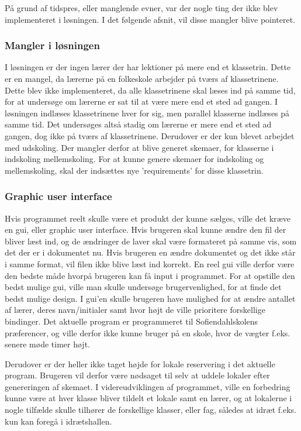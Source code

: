 På grund af tidspres, eller manglende evner, var der nogle ting der ikke blev implementeret i løsningen. I det følgende afsnit, vil disse mangler blive pointeret. 
\subsubsection{Mangler i løsningen}

I løsningen er der ingen lærer der har lektioner på mere end et klassetrin. Dette er en mangel, da lærerne på en folkeskole arbejder på tværs af klassetrinene. Dette blev ikke implementeret, da alle klassetrinene skal læses ind på samme tid, for at undersøge om lærerne er sat til at være mere end et sted ad gangen. I løsningen indlæses klassetrinene hver for sig, men parallel klasserne indlæses på samme tid. Det undersøges altså stadig om lærerne er mere end et sted ad gangen, dog ikke på tværs af klassetrinene. 
Derudover er der kun blevet arbejdet med udskoling. Der mangler derfor at blive generet skemaer, for klasserne i indskoling mellemskoling. For at kunne genere skemaer for indskoling og mellemskoling, skal der indsættes nye ’requirements’ for disse klassetrin.
\subsubsection{Graphic user interface}

Hvis programmet reelt skulle være et produkt der kunne sælges, ville det kræve en gui, eller graphic user interface. Hvis brugeren skal kunne ændre den fil der bliver læst ind, og de ændringer de laver skal være formateret på samme vis, som det der er i dokumentet nu. Hvis brugeren en ændre dokumentet og det ikke står i samme format, vil filen ikke blive læst ind korrekt. En reel gui ville derfor være den bedste måde hvorpå brugeren kan få input i programmet. For at opstille den bedst mulige gui, ville man skulle undersøge brugervenlighed, for at finde det bedst mulige design. I gui’en skulle brugeren have mulighed for at ændre antallet af lærer, deres navn/initialer samt hvor højt de ville prioritere forskellige bindinger. 
Det aktuelle program er programmeret til Sofiendahlskolens præferencer, og ville derfor ikke kunne bruger på en skole, hvor de vægter f.eks. senere møde timer højt. 


Derudover er der heller ikke taget højde for lokale reservering i det aktuelle program. Brugeren vil derfor være nødsaget til selv at uddele lokaler efter genereringen af skemaet. I videreudviklingen af programmet, ville en forbedring kunne være at hver klasse bliver tildelt et lokale samt en lærer, og at lokalerne i nogle tilfælde skulle tilhører de forskellige klasser, eller fag, således at idræt f.eks. kun kan foregå i idrætshallen. 


